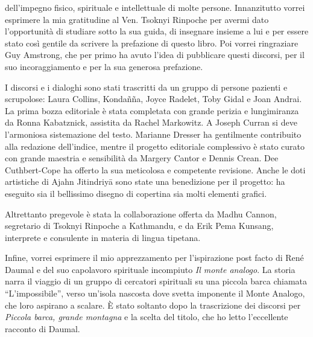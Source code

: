 
 dell'impegno fisico, spirituale e intellettuale di molte persone. Innanzitutto vorrei esprimere la mia gratitudine al Ven. Tsoknyi Rinpoche per avermi dato l'opportunità di studiare sotto la sua guida, di insegnare insieme a lui e per essere stato così gentile da scrivere la prefazione di questo libro. Poi vorrei ringraziare Guy Amstrong, che per primo ha avuto l'idea di pubblicare questi discorsi, per il suo incoraggiamento e per la sua generosa prefazione.

I discorsi e i dialoghi sono stati trascritti da un gruppo di persone pazienti e scrupolose: Laura Collins, Kondañña, Joyce Radelet, Toby Gidal e Joan Andrai. La prima bozza editoriale è stata completata con grande perizia e lungimiranza da Ronna Kabatznick, assistita da Rachel Markowitz. A Joseph Curran si deve l'armoniosa sistemazione del testo. Marianne Dresser ha gentilmente contribuito alla redazione dell'indice, mentre il progetto editoriale complessivo è stato curato con grande maestria e sensibilità da Margery Cantor e Dennis Crean. Dee Cuthbert-Cope ha offerto la sua meticolosa e competente revisione. Anche le doti artistiche di Ajahn Jitindriyā sono state una benedizione per il progetto: ha eseguito sia il bellissimo disegno di copertina sia molti elementi grafici.

Altrettanto pregevole è stata la collaborazione offerta da Madhu Cannon, segretario di Tsoknyi Rinpoche a Kathmandu, e da Erik Pema Kunsang, interprete e consulente in materia di lingua tipetana.

Infine, vorrei esprimere il mio apprezzamento per l'ispirazione post facto di René Daumal e del suo capolavoro spirituale incompiuto \textit{Il monte analogo}. La storia narra il viaggio di un gruppo di cercatori spirituali su una piccola barca chiamata ``L'impossibile'', verso un'isola nascosta dove svetta imponente il Monte Analogo, che loro aspirano a scalare. È stato soltanto dopo la trascrizione dei discorsi per \textit{Piccola barca, grande montagna} e la scelta del titolo, che ho letto l'eccellente racconto di Daumal.

